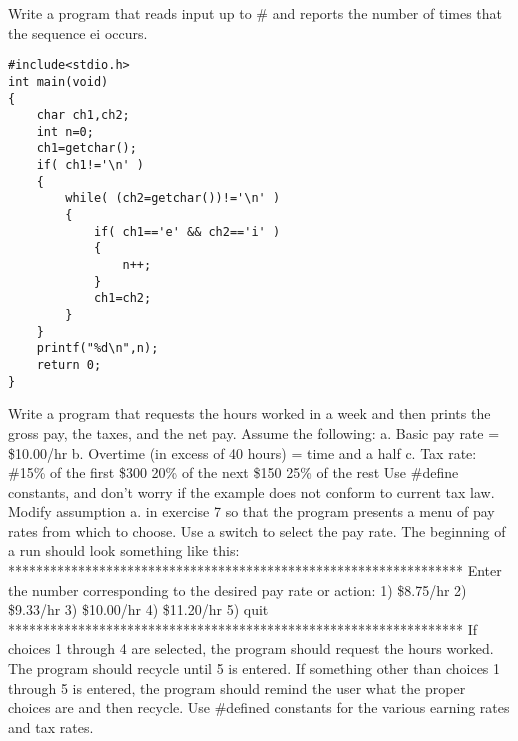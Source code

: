 \begin{question}
  Write a program that reads input up to # and reports the number of times that the
  sequence ei occurs.
\end{question}
\begin{solution}
  \begin{verbatim}
#include<stdio.h>
int main(void)
{
	char ch1,ch2;
	int n=0;
	ch1=getchar();
	if( ch1!='\n' )
	{
		while( (ch2=getchar())!='\n' )
		{
			if( ch1=='e' && ch2=='i' )
			{
				n++;
			}
			ch1=ch2;
		}
	}
	printf("%d\n",n);
	return 0;
}
  \end{verbatim}
\end{solution}
\begin{question}
  Write a program that requests the hours worked in a week and then prints the gross pay,
  the taxes, and the net pay. Assume the following:
  a. Basic pay rate = \$10.00/hr
  b. Overtime (in excess of 40 hours) = time and a half
  c. Tax rate: \#15\% of the first \$300
		 20\% of the next \$150
		 25\% of the rest
  Use #define constants, and don’t worry if the example does not conform to current
  tax law.
  Modify assumption a. in exercise 7 so that the program presents a menu of pay rates
  from which to choose. Use a switch to select the pay rate. The beginning of a run
  should look something like this:
  *****************************************************************
  Enter the number corresponding to the desired pay rate or action:
1) \$8.75/hr
 2) \$9.33/hr
 3) \$10.00/hr
  4) \$11.20/hr
5) quit
*****************************************************************
If choices 1 through 4 are selected, the program should request the hours worked. The
program should recycle until 5 is entered. If something other than choices 1 through 5
is entered, the program should remind the user what the proper choices are and then
recycle. Use #defined constants for the various earning rates and tax rates.
\end{question}
